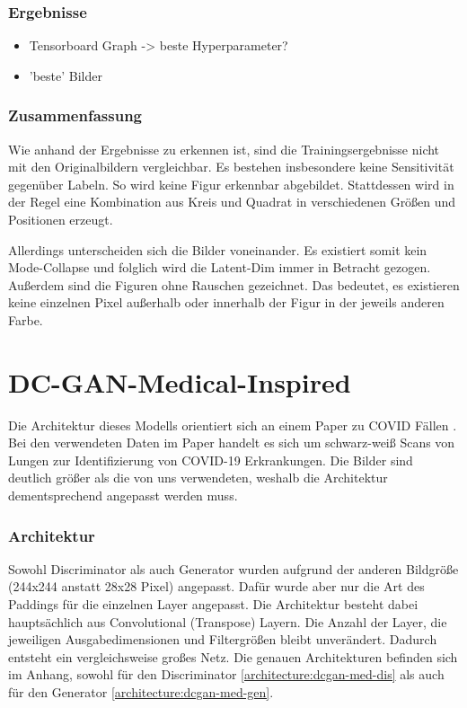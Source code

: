 \subsubsection{Ergebnisse}
\begin{itemize}
	\item Tensorboard Graph -> beste Hyperparameter?
	\item 'beste' Bilder
\end{itemize}

\subsubsection{Zusammenfassung}
Wie anhand der Ergebnisse zu erkennen ist, sind die Trainingsergebnisse nicht mit den Originalbildern vergleichbar.
Es bestehen insbesondere keine Sensitivität gegenüber Labeln.
So wird keine Figur erkennbar abgebildet.
Stattdessen wird in der Regel eine Kombination aus Kreis und Quadrat in verschiedenen Größen und Positionen erzeugt.
\newline

Allerdings unterscheiden sich die Bilder voneinander.
Es existiert somit kein Mode-Collapse und folglich wird die Latent-Dim immer in Betracht gezogen.
Außerdem sind die Figuren ohne Rauschen gezeichnet.
Das bedeutet, es existieren keine einzelnen Pixel außerhalb oder innerhalb der Figur in der jeweils anderen Farbe.

\section{DC-GAN-Medical-Inspired}

Die Architektur dieses Modells orientiert sich an einem Paper zu COVID Fällen \cite{inspiration-dc-gan-med}.
Bei den verwendeten Daten im Paper handelt es sich um schwarz-weiß Scans von Lungen zur Identifizierung von COVID-19 Erkrankungen.
Die Bilder sind deutlich größer als die von uns verwendeten, weshalb die Architektur dementsprechend angepasst werden muss.

\subsubsection{Architektur}
Sowohl Discriminator als auch Generator wurden aufgrund der anderen Bildgröße (244x244 anstatt 28x28 Pixel) angepasst.
Dafür wurde aber nur die Art des Paddings für die einzelnen Layer angepasst.
Die Architektur besteht dabei hauptsächlich aus Convolutional (Transpose) Layern.
Die Anzahl der Layer, die jeweiligen Ausgabedimensionen und Filtergrößen bleibt unverändert.
Dadurch entsteht ein vergleichsweise großes Netz.
Die genauen Architekturen befinden sich im Anhang, sowohl für den Discriminator \cref{architecture:dcgan-med-dis} als auch für den Generator \cref{architecture:dcgan-med-gen}.

